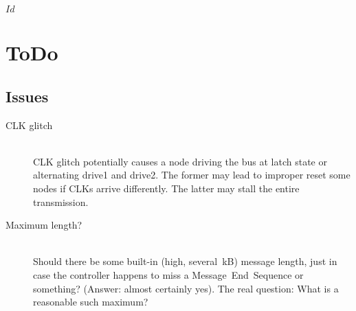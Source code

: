 \svnInfo $Id$

\section{ToDo}
\label{sec:todo}
\subsection{Issues}
\begin{description}
	\item[CLK glitch] \hfil \\
	CLK glitch potentially causes a node driving the bus at {\sc latch state} or
	alternating {\sc drive1} and {\sc drive2}. The former may lead to improper
	reset some nodes if CLKs arrive differently. The latter may stall the entire
	transmission.

  \item[Maximum length?] \hfil \\
  Should there be some built-in (high, several~kB) message length, just in
  case the controller happens to miss a Message~End~Sequence or something?
  (Answer: almost certainly yes). The real question: What is a reasonable such
  maximum?
\end{description}
